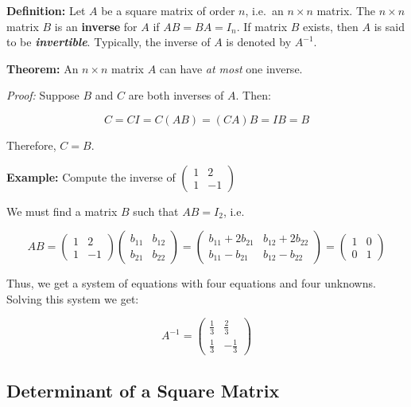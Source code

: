 \documentclass[11pt]{article}
\begin{document}
\textbf{Definition:} Let \(A\) be a square matrix of order \(n\),
i.e.~an \(n\times n\) matrix. The \(n\times n\) matrix \(B\) is an
\textbf{inverse} for \(A\) if \(AB = BA = I_n\). If matrix \(B\) exists,
then \(A\) is said to be \textbf{\emph{invertible}}. Typically, the
inverse of \(A\) is denoted by \(A^{-1}\).

\textbf{Theorem:} An \(n\times n\) matrix \(A\) can have \emph{at most}
one inverse.

\emph{Proof:} Suppose \(B\) and \(C\) are both inverses of \(A\). Then:

\[
C = CI = C(AB) = (CA)B = IB = B
\]

Therefore, \(C = B\).

\textbf{Example:} Compute the inverse of
\(\begin{pmatrix} 1 & 2 \\ 1 & -1 \end{pmatrix}\)

We must find a matrix \(B\) such that \(AB = I_2\), i.e.

\[
AB = \begin{pmatrix} 1 & 2 \\ 1 & -1 \end{pmatrix} \begin{pmatrix} b_{11} & b_{12} \\ b_{21} & b_{22} \end{pmatrix} = \begin{pmatrix} b_{11} + 2b_{21} & b_{12} + 2b_{22} \\ b_{11} - b_{21} & b_{12} - b_{22} \end{pmatrix} = \begin{pmatrix} 1 & 0 \\ 0 & 1 \end{pmatrix}
\]

Thus, we get a system of equations with four equations and four
unknowns. Solving this system we get:

\[
A^{-1} = \begin{pmatrix} \frac{1}{3} & \frac{2}{3} \\ \frac{1}{3} & -\frac{1}{3} \end{pmatrix}
\]

    \hypertarget{determinant-of-a-square-matrix}{%
\subsection{Determinant of a Square
Matrix}\label{determinant-of-a-square-matrix}}
\end{document}
